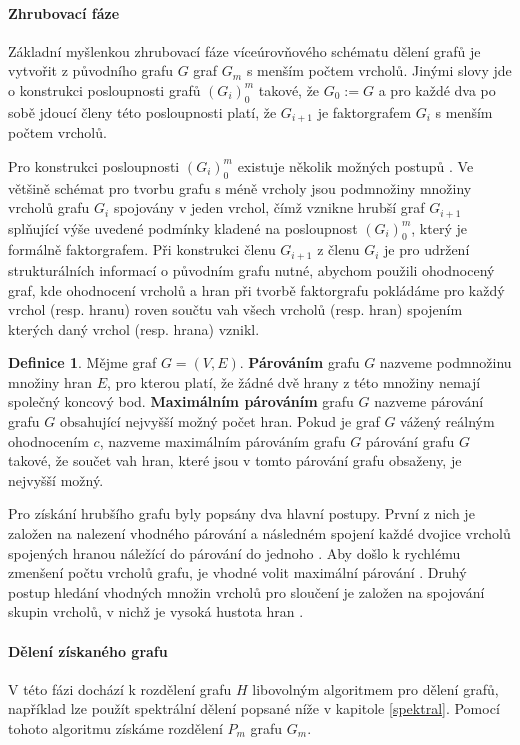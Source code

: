 \documentclass{ctuthesis}
\theoremstyle{plain}
\theoremstyle{definition}
\newtheorem{definition}{Definice}
\begin{document}
\paragraph{Zhrubovací fáze}
Základní myšlenkou zhrubovací fáze víceúrovňového schématu dělení grafů je vytvořit z původního grafu $G$ graf $G_m$ s menším počtem vrcholů. Jinými slovy jde o konstrukci posloupnosti grafů $(G_i)_0^m$ takové, že $G_0 := G$ a pro každé dva po sobě jdoucí členy této posloupnosti platí, že $G_{i+1}$ je faktorgrafem $G_i$ s menším počtem vrcholů. 

Pro konstrukci posloupnosti $(G_i)_0^m$ existuje několik možných postupů \cite{lehe:95,lehe:94}. Ve většině schémat pro tvorbu grafu s méně vrcholy jsou podmnožiny množiny vrcholů grafu $G_i$ spojovány v jeden vrchol, čímž vznikne hrubší graf $G_{i+1}$ splňující výše uvedené podmínky kladené na posloupnost $(G_i)_0^m$, který je formálně faktorgrafem. Při konstrukci členu $G_{i+1}$ z členu $G_i$ je pro udržení strukturálních informací o původním grafu nutné, abychom použili ohodnocený graf, kde ohodnocení vrcholů a hran při tvorbě faktorgrafu pokládáme pro každý vrchol (resp. hranu) roven součtu vah všech vrcholů (resp. hran) spojením kterých daný vrchol (resp. hrana) vznikl. 

\begin{definition}
  Mějme graf $G = (V, E)$. \textbf{Párováním} grafu $G$ nazveme podmnožinu množiny hran $E$, pro kterou platí, že žádné dvě hrany z této množiny nemají společný koncový bod. \textbf{Maximálním párováním} grafu $G$ nazveme párování grafu $G$ obsahující nejvyšší možný počet hran. Pokud je graf $G$ vážený reálným ohodnocením $c$, nazveme maximálním párováním grafu $G$ párování grafu $G$ takové, že součet vah hran, které jsou v tomto párování grafu obsaženy, je nejvyšší možný.
\end{definition}

Pro získání hrubšího grafu byly popsány dva hlavní postupy. První z nich je založen na nalezení vhodného párování a následném spojení každé dvojice vrcholů spojených hranou náležící do párování do jednoho \cite{edmo:65,lawl:76}. Aby došlo k rychlému zmenšení počtu vrcholů grafu, je vhodné volit maximální párování \cite{hele:95}. Druhý postup hledání vhodných množin vrcholů pro sloučení je založen na spojování skupin vrcholů, v nichž je vysoká hustota hran \cite{lehe:94}.

\paragraph{Dělení získaného grafu}
V této fázi dochází k rozdělení grafu $H$ libovolným algoritmem pro dělení grafů, například lze použít spektrální dělení popsané níže v kapitole \ref{spektral}. Pomocí tohoto algoritmu získáme rozdělení $P_m$ grafu $G_m$.
\end{document}
